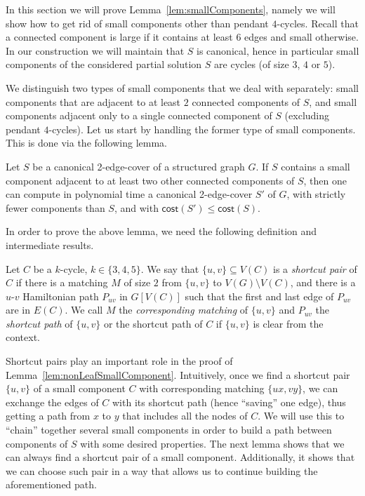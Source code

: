 \documentclass{theoretics}
\newcommand{\cost}{\mathsf{cost}}
\begin{document}
In this section we will prove Lemma~\ref{lem:smallComponents}, namely we will show how to get rid of small components other than pendant $4$-cycles. Recall that a connected component is large if it contains at least 6 edges and small otherwise. In our construction we will maintain that $S$ is canonical, hence in particular small components of the considered partial solution $S$ are cycles (of size $3$, $4$ or $5$).

We distinguish two types of small components that we deal with separately: small components that are adjacent to at least $2$ connected components of $S$, and small components adjacent only to a single connected component of $S$ (excluding pendant $4$-cycles). Let us start by handling the former type of small components. This is done via the following lemma.
\begin{lemma}\label{lem:nonLeafSmallComponent}
     Let $S$ be a canonical 2-edge-cover of a structured graph $G$. If $S$ contains a small component adjacent to at least two other connected components of $S$, then one can compute in polynomial time a canonical 2-edge-cover $S'$ of $G$, with strictly fewer components than $S$, and with $\cost(S')\leq \cost(S)$.
\end{lemma}
In order to prove the above lemma, we need the following definition and intermediate results.
 
\begin{definition}\label{def:shortcutPair}
     Let $C$ be a $k$-cycle, $k\in \{3,4,5\}$. We say that $\{u,v\}\subseteq V(C)$ is a \emph{shortcut pair} of $C$ if there is a matching $M$ of size $2$ from $\{u,v\}$ to $V(G)\setminus V(C)$, and there is a $u$-$v$ Hamiltonian path $P_{uv}$ in $G[V(C)]$ such that the first and last edge of $P_{uv}$ are in $E(C)$. We call $M$ the \emph{corresponding matching} of $\{u,v\}$ and $P_{uv}$ the \emph{shortcut path} of $\{u,v\}$ or the shortcut path of $C$ if $\{u,v\}$ is clear from the context.
\end{definition}

Shortcut pairs play an important role in the proof of Lemma~\ref{lem:nonLeafSmallComponent}. Intuitively, once we find a shortcut pair $\{u, v\}$ of a small component $C$ with corresponding matching $\{ux, vy\}$, we can exchange the edges of $C$ with its shortcut path (hence ``saving'' one edge), thus getting a path from $x$ to $y$ that includes all the nodes of $C$. We will use this to ``chain'' together several small components in order to build a path between components of $S$ with some desired properties. The next lemma shows that we can always find a shortcut pair of a small component. Additionally, it shows that we can choose such pair in a way that allows us to continue building the aforementioned path.
\end{document}
